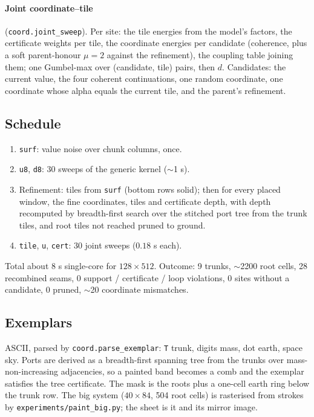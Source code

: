 \documentclass[11pt]{article}
\newcommand{\1}{\mathds{1}}
\newcommand{\code}[1]{\texttt{#1}}
\begin{document}
\paragraph{Joint coordinate--tile} (\code{coord.joint\_sweep}). Per site:
the tile energies from the model's factors, the certificate weights per
tile, the coordinate energies per candidate (coherence, plus a soft
parent-honour $\mu = 2$ against the refinement), the coupling table joining
them; one Gumbel-max over (candidate, tile) pairs, then $d$. Candidates: the
current value, the four coherent continuations, one random coordinate,
one coordinate whose alpha equals the current tile, and the parent's
refinement.

\subsection{Schedule}

\begin{enumerate}
\item \code{surf}: value noise over chunk columns, once.
\item \code{u8}, \code{d8}: 30 sweeps of the generic kernel ($\sim$1 s).
\item Refinement: tiles from \code{surf} (bottom rows solid); then for every
  placed window, the fine coordinates, tiles and certificate depth, with
  depth recomputed by breadth-first search over the stitched port tree
  from the trunk tiles, and root tiles not reached pruned to ground.
\item \code{tile}, \code{u}, \code{cert}: 30 joint sweeps ($0.18$ s each).
\end{enumerate}
Total about 8 s single-core for $128 \times 512$. Outcome: 9 trunks, $\sim$2200
root cells, 28 recombined seams, $0$ support / certificate / loop
violations, $0$ sites without a candidate, $0$ pruned, $\sim$20 coordinate
mismatches.

\subsection{Exemplars}

ASCII, parsed by \code{coord.parse\_exemplar}: \code{T} trunk, digits mass,
dot earth, space sky. Ports are derived as a breadth-first spanning tree
from the trunks over mass-non-increasing adjacencies, so a painted band
becomes a comb and the exemplar satisfies the tree certificate. The mask
is the roots plus a one-cell earth ring below the trunk row. The big
system ($40 \times 84$, 504 root cells) is rasterised from strokes by
\code{experiments/paint\_big.py}; the sheet is it and its mirror image.
\end{document}

